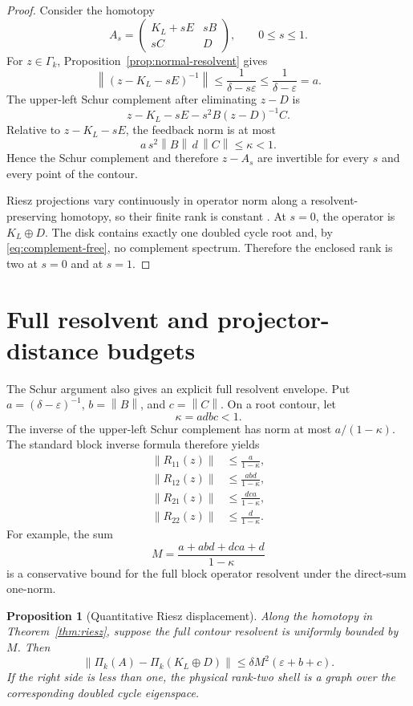 \documentclass[12pt]{article}
\newtheorem{proposition}[theorem]{Proposition}
\theoremstyle{remark}
\newcommand{\norm}[1]{\left\lVert#1\right\rVert}
\begin{document}
\begin{proof}
Consider the homotopy
\[
 A_s=\begin{pmatrix}
 K_L+sE&sB\\
 sC&D
 \end{pmatrix},
 \qquad 0\le s\le1.
\]
For $z\in\Gamma_k$, Proposition~\ref{prop:normal-resolvent} gives
\[
 \norm{(z-K_L-sE)^{-1}}
 \le\frac1{\delta-s\varepsilon}
 \le\frac1{\delta-\varepsilon}=a.
\]
The upper-left Schur complement after eliminating $z-D$ is
\[
 z-K_L-sE-s^2B(z-D)^{-1}C.
\]
Relative to $z-K_L-sE$, the feedback norm is at most
\[
 a\,s^2\norm B\,d\,\norm C\le\kappa<1.
\]
Hence the Schur complement and therefore $z-A_s$ are invertible for every
$s$ and every point of the contour.

Riesz projections vary continuously in operator norm along a resolvent-
preserving homotopy, so their finite rank is constant \citep{Kato1995}.  At
$s=0$, the operator is $K_L\oplus D$.  The disk contains exactly one doubled
cycle root and, by \eqref{eq:complement-free}, no complement spectrum.
Therefore the enclosed rank is two at $s=0$ and at $s=1$.
\end{proof}

\section{Full resolvent and projector-distance budgets}

The Schur argument also gives an explicit full resolvent envelope.  Put
$a=(\delta-\varepsilon)^{-1}$,
$b=\norm B$, and $c=\norm C$.  On a root contour, let
\[
 \kappa=adbc<1.
\]
The inverse of the upper-left Schur complement has norm at most
$a/(1-\kappa)$.  The standard block inverse formula therefore yields
\begin{align}
 \norm{R_{11}(z)}&\le\frac{a}{1-\kappa},
 \label{eq:r11}\\
 \norm{R_{12}(z)}&\le\frac{abd}{1-\kappa},
 \label{eq:r12}\\
 \norm{R_{21}(z)}&\le\frac{dca}{1-\kappa},
 \label{eq:r21}\\
 \norm{R_{22}(z)}&\le\frac{d}{1-\kappa}.
 \label{eq:r22}
\end{align}
For example, the sum
\begin{equation}\label{eq:full-resolvent}
 M=\frac{a+abd+dca+d}{1-\kappa}
\end{equation}
is a conservative bound for the full block operator resolvent under the
direct-sum one-norm.

\begin{proposition}[Quantitative Riesz displacement]
\label{prop:projector-distance}
Along the homotopy in Theorem~\ref{thm:riesz}, suppose the full contour
resolvent is uniformly bounded by $M$.  Then
\begin{equation}\label{eq:projector-distance}
 \norm{\Pi_k(A)-\Pi_k(K_L\oplus D)}
 \le \delta M^2(\varepsilon+b+c).
\end{equation}
If the right side is less than one, the physical rank-two shell is a graph
over the corresponding doubled cycle eigenspace.
\end{proposition}
\end{document}
